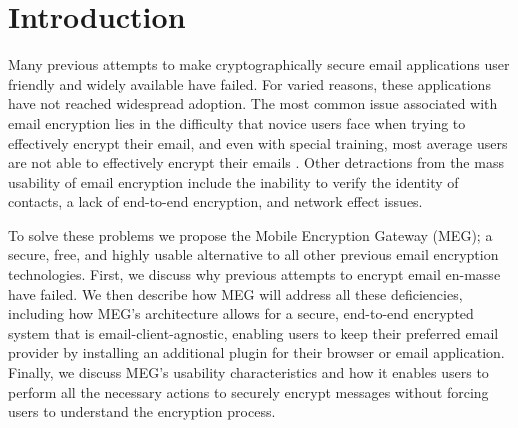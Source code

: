\documentclass{sig-alternate-05-2015}
\begin{document}
\section{Introduction}
\par Many previous attempts to make cryptographically secure email applications user friendly and widely available have failed. For varied reasons, these applications have not reached widespread adoption. The most common issue associated with email encryption lies in the difficulty that novice users face when trying to effectively encrypt their email, and even with special training, most average users are not able to effectively encrypt their emails \cite{whitten1999johnny}. Other detractions from the mass usability of email encryption include the inability to verify the identity of contacts, a lack of end-to-end encryption, and network effect issues.
\par To solve these problems we propose the Mobile Encryption Gateway (MEG); a secure, free, and highly usable alternative to all other previous email encryption technologies. First, we discuss why previous attempts to encrypt email en-masse have failed. We then describe how MEG will address all these deficiencies, including how MEG's architecture allows for a secure, end-to-end encrypted system that is email-client-agnostic, enabling users to keep their preferred email provider by installing an additional plugin for their browser or email application. Finally, we discuss MEG's usability characteristics and how it enables users to perform all the necessary actions to securely encrypt messages without forcing users to understand the encryption process.
\end{document}
